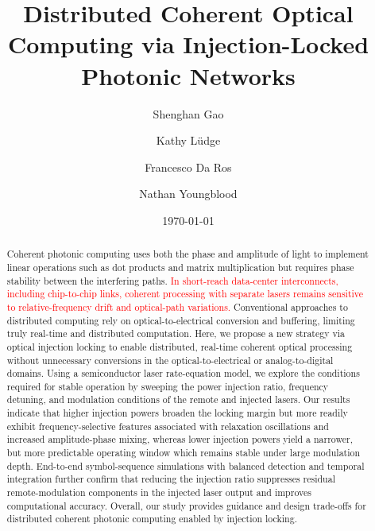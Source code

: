 \documentclass[%
 aip,
 apl,
 amsmath,amssymb,
 reprint,%
 floatfix,
]{revtex4-1}
\newcommand{\reviewreplace}[2]{\textcolor{red}{#2}}
\begin{document}
\title[Distributed coherent optical computing]{Distributed Coherent Optical Computing via Injection-Locked Photonic Networks}

\author{Shenghan Gao}

\author{Kathy L\"udge}

\author{Francesco Da Ros}

\author{Nathan Youngblood}

\date{\today}

\begin{abstract}
    Coherent photonic computing uses both the phase and amplitude of light to implement linear operations such as dot products and matrix multiplication but requires phase stability between the interfering paths. \reviewreplace{This poses a challenge when attempting to achieve coherent optical computation over long distances if the interfering data streams are generated by different lasers due to environmental phase variations in fiber and unstable beating between the two lasers.}{In short-reach data-center interconnects, including chip-to-chip links, coherent processing with separate lasers remains sensitive to relative-frequency drift and optical-path variations.} Conventional approaches to distributed computing rely on optical-to-electrical conversion and buffering, limiting truly real-time and distributed computation. Here, we propose a new strategy via optical injection locking to enable distributed, real-time coherent optical processing without unnecessary conversions in the optical-to-electrical or analog-to-digital domains. Using a semiconductor laser rate-equation model, we explore the conditions required for stable operation by sweeping the power injection ratio, frequency detuning, and modulation conditions of the remote and injected lasers. Our results indicate that higher injection powers broaden the locking margin but more readily exhibit frequency-selective features associated with relaxation oscillations and increased amplitude-phase mixing, whereas lower injection powers yield a narrower, but more predictable operating window which remains stable under large modulation depth. End-to-end symbol-sequence simulations with balanced detection and temporal integration further confirm that reducing the injection ratio suppresses residual remote-modulation components in the injected laser output and improves computational accuracy. Overall, our study provides guidance and design trade-offs for distributed coherent photonic computing enabled by injection locking.

\end{abstract}
\end{document}
